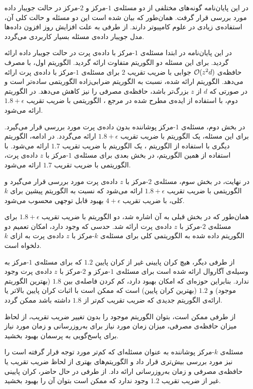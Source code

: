 

در این پایان‌نامه گونه‌های مختلفی از دو مسئله‌ی $1$-مرکز‌ و $2$-مرکز در حالت‌ جویبار داده  مورد بررسی قرار گرفت. همان‌طور که بیان شده است این دو مسئله و حالت کلی آن، استفاده‌ی زیادی در علوم کامپیوتر دارند. از طرفی به علت افزایش روز افزون داده‌ها مدل‌ جویبار داده‌ی مسئله بسیار کاربردی می‌گردد.

در این پایان‌نامه در ابتدا مسئله‌ی $1$-مرکز با داده‌ی پرت در حالت جویبار داده ارائه گردید. برای این مسئله دو الگوریتم متفاوت ارائه گردید. الگوریتم اول، با مصرف حافظه‌ی $\mathcal{O}(z^2d)$ جوابی با ضریب تقریب $2$ برای مسئله‌ی $1$-مرکز با داده‌ی پرت ارائه می‌دهد. الگوریتم ارائه شده، نسبت به الگوریتم ضرابی‌زاده  الگوریتمی ساده‌تر است و در صورتی که $d$ از $z$ بزرگ‌تر باشد، حافظه‌ی مصرفی را نیز کاهش می‌دهد. در الگوریتم دوم، با استفاده از ایده‌ی مطرح شده در مرجع ، الگوریتمی با ضریب تقریب $1.8 + \epsilon$ ارائه می‌شود.

در بخش دوم، مسئله‌ی $1$-مرکز پوشاننده بدون داده‌ی پرت مورد بررسی قرار می‌گیرد. برای این مسئله، یک الگوریتم با ضریب تقریب $1.8 + \epsilon$ ارائه می‌گردد. در ادامه، الگوریتم دیگری با استفاده از الگوریتم ، یک الگوریتم با ضریب تقریب $1.7$ ارائه می‌شود. با استفاده از همین الگوریتم، در بخش بعدی برای مسئله‌ی $1$-مرکز با $z$ داده‌ی پرت، الگوریتمی با ضریب تقریب $1.7$ ارائه می‌شود.

در نهایت، در بخش سوم، مسئله‌ی $2$-مرکز با $z$ داده‌ی پرت مورد بررسی قرار می‌گیرد و الگوریتمی با ضریب تقریب $1.8 + \epsilon$ ارائه می‌شود که نسبت به الگوریتم پیشین برای $k$ کلی، با ضریب تقریب $4 + \epsilon$ بهبود قابل توجهی محسوب می‌شود.


همان‌طور که در بخش قبلی به آن اشاره شد، دو الگوریتم با ضریب تقریب $1.8 + \epsilon$ برای مسئله‌ی $2$-مرکز با $z$ داده‌ی پرت ارائه شد.
حدسی که وجود دارد، امکان تعمیم دو الگوریتم داده شده به الگوریتمی کلی برای مسئله‌ی $k$-مرکز با $z$ داده‌ی پرت به ازای $k$ دلخواه است.

از طرفی دیگر، هیچ کران پایینی غیر از کران پایین $1.2$ که برای مسئله‌ی $1$-مرکز به وسیله‌ی آگاروال ارائه شده است  برای مسئله‌ی $1$-مرکز و $2$-مرکز با $z$ داده‌ی پرت وجود ندارد.
بنابراین حوزه‌ای که امکان بهبود دارد، کم کردن فاصله‌ی بین $1.8$ (بهترین الگوریتم موجود) و $1.2$ (بهترین کران پایین) است که ممکن است با اثبات کران پایین بالا‌تر یا ارائه‌ی الگوریتم جدیدی که ضریب تقریب کم‌تر از $1.8$ داشته باشد ممکن گردد.

از طرفی ممکن است، بتوان الگوریتم موجود را بدون تغییر ضریب تقریب، از لحاظ میزان حافظه‌ی مصرفی، میزان زمان مورد نیاز برای به‌روزرسانی و زمان مورد نیاز برای پاسخ‌گویی به پرسمان بهبود بخشید.

مسئله‌ی $k$-مرکز پوشاننده به عنوان مسئله‌ای که کم‌تر مورد توجه قرار گرفته است را نیز مورد بررسی بیش‌تری قرار داد و الگوریتم‌های بهتری از لحاظ ضریب تقریب یا حافظه‌ی مصرفی و زمان به‌روزرسانی ارائه داد.
از طرفی در حال حاضر، کران پایینی غیر از ضریب تقریب $1.2$ وجود ندارد که ممکن است بتوان آن را بهبود بخشید.
